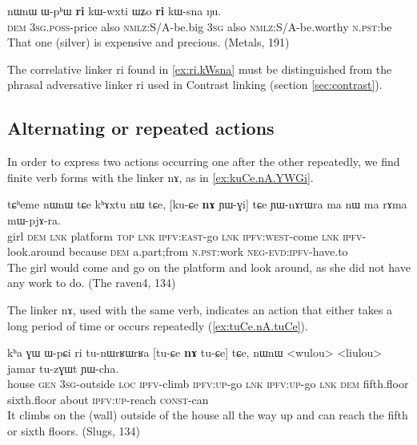 \documentclass[oldfontcommands,oneside,a4paper,11pt]{article}
\newcommand{\ipa}[1]{{\phon \mbox{#1}}} %
\begin{document}
 \begin{exe}
\ex \label{ex:ri.kWsna}
\gll
\ipa{nɯnɯ}  	\ipa{ɯ-pʰɯ}  	\ipa{\textbf{ri}}  	\ipa{kɯ-wxti}  	\ipa{ɯʑo}  	\ipa{\textbf{ri}}  	\ipa{kɯ-sna}  	\ipa{ŋu.}  \\
\textsc{dem} \textsc{3sg.poss}-price also \textsc{nmlz:S/A}-be.big \textsc{3sg} also \textsc{nmlz:S/A}-be.worthy \textsc{n.pst}:be \\
\glt That one (silver) is expensive and precious. (Metals, 191)
\end{exe}

The correlative linker \ipa{ri} found in \ref{ex:ri.kWsna} must be distinguished from the phrasal adversative linker \ipa{ri} used in Contrast linking (section \ref{sec:contrast}).

\subsection{Alternating or repeated actions} \label{sec:alternating}

In order to express two actions occurring one after the other repeatedly, we find finite verb forms with the linker \ipa{nɤ}, as in \ref{ex:kuCe.nA.YWGi}.

\begin{exe}
\ex \label{ex:kuCe.nA.YWGi}
\gll
\ipa{tɕʰeme}  	\ipa{nɯnɯ}  	\ipa{tɕe}  	\ipa{kʰɤxtu}  	\ipa{nɯ}  	\ipa{tɕe,}  	[\ipa{ku-ɕe}  	\ipa{\textbf{nɤ}}  	\ipa{ɲɯ-ɣi}]  	\ipa{tɕe}  	\ipa{ɲɯ-nɤrɯra}  	\ipa{ma}  	\ipa{nɯ}  	\ipa{ma}  	\ipa{rɤma}  	\ipa{mɯ-pjɤ-ra.}  \\
girl \textsc{dem} \textsc{lnk} platform \textsc{top} \textsc{lnk} \textsc{ipfv:east}-go \textsc{lnk} \textsc{ipfv:west}-come \textsc{lnk} \textsc{ipfv}-look.around because \textsc{dem} a.part;from \textsc{n.pst}:work \textsc{neg-evd:ipfv}-have.to \\ 
\glt The girl would come and go on the platform and look around, as she did not have any work to do. (The raven4, 134)
\end{exe}


The linker \ipa{nɤ}, used with the same verb, indicates an action that either takes a long period of time or occurs repeatedly (\ref{ex:tuCe.nA.tuCe}).
\begin{exe}
\ex \label{ex:tuCe.nA.tuCe}
\gll
\ipa{kʰa}  	\ipa{ɣɯ}  	\ipa{ɯ-pɕi}  	\ipa{ri}  	\ipa{tu-nɯrʁɯrʁa}  	[\ipa{tu-ɕe}  	\ipa{\textbf{nɤ}}  	\ipa{tu-ɕe}]  	\ipa{tɕe,}  	\ipa{nɯnɯ}  	<wulou>  	<liulou>  	\ipa{jamar}  	\ipa{tu-zɣɯt}  	\ipa{ɲɯ-cha.}  \\
house \textsc{gen} \textsc{3sg}-outside \textsc{loc} \textsc{ipfv}-climb \textsc{ipfv:up}-go \textsc{lnk} \textsc{ipfv:up}-go \textsc{lnk} \textsc{dem} fifth.floor sixth.floor about \textsc{ipfv:up}-reach \textsc{const}-can \\
\glt It climbs on the (wall) outside of the house all the way up and can reach the fifth or   sixth floors.
(Slugs, 134)
\end{exe}
 
\end{document}
